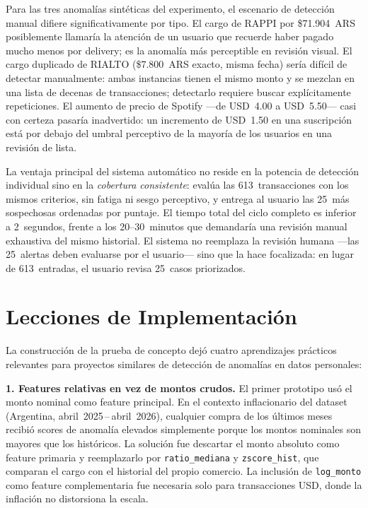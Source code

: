 \documentclass[conference]{IEEEtran}
\begin{document}
Para las tres anomal\'ias sint\'eticas del experimento, el escenario de detecci\'on
manual difiere significativamente por tipo. El cargo de RAPPI por \$71.904~ARS
posiblemente llamar\'ia la atenci\'on de un usuario que recuerde haber pagado mucho
menos por delivery; es la anomal\'ia m\'as perceptible en revisi\'on visual. El cargo
duplicado de RIALTO (\$7.800~ARS exacto, misma fecha) ser\'ia dif\'icil de detectar
manualmente: ambas instancias tienen el mismo monto y se mezclan en una lista de
decenas de transacciones; detectarlo requiere buscar expl\'icitamente repeticiones.
El aumento de precio de Spotify ---de USD~4.00 a USD~5.50--- casi con certeza
pasar\'ia inadvertido: un incremento de USD~1.50 en una suscripci\'on est\'a por
debajo del umbral perceptivo de la mayor\'ia de los usuarios en una revisi\'on
de lista.

La ventaja principal del sistema autom\'atico no reside en la potencia de detecci\'on
individual sino en la \emph{cobertura consistente}: eval\'ua las 613~transacciones con
los mismos criterios, sin fatiga ni sesgo perceptivo, y entrega al usuario las
25~m\'as sospechosas ordenadas por puntaje. El tiempo total del ciclo completo es
inferior a 2~segundos, frente a los 20--30~minutos que demandar\'ia una revisi\'on
manual exhaustiva del mismo historial. El sistema no reemplaza la revisi\'on humana
---las 25~alertas deben evaluarse por el usuario--- sino que la hace focalizada:
en lugar de 613~entradas, el usuario revisa 25~casos priorizados.

\section{Lecciones de Implementaci\'on}
\label{sec:lecciones}

La construcci\'on de la prueba de concepto dej\'o cuatro aprendizajes pr\'acticos
relevantes para proyectos similares de detecci\'on de anomal\'ias en datos personales:

\textbf{1. Features relativas en vez de montos crudos.}
El primer prototipo us\'o el monto nominal como feature principal. En el contexto
inflacionario del dataset (Argentina, abril~2025\,--\,abril~2026), cualquier compra
de los \'ultimos meses recibi\'o scores de anomal\'ia elevados simplemente porque
los montos nominales son mayores que los hist\'oricos. La soluci\'on fue descartar
el monto absoluto como feature primaria y reemplazarlo por \texttt{ratio\_mediana}
y \texttt{zscore\_hist}, que comparan el cargo con el historial del propio comercio.
La inclusi\'on de \texttt{log\_monto} como feature complementaria fue necesaria solo
para transacciones USD, donde la inflaci\'on no distorsiona la escala.
\end{document}
